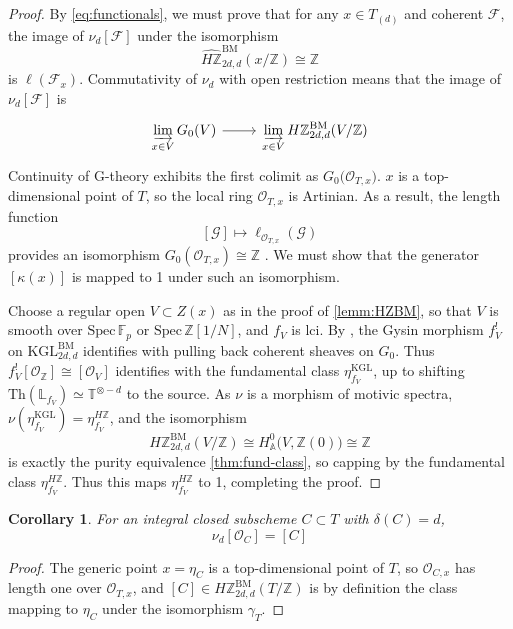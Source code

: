 \documentclass[11pt, twoside]{article}
\numberwithin{equation}{section}
\newtheorem{corollary}[equation]{Corollary}
\theoremstyle{definition}
\newcommand{\bb}[1]{\mathbb{#1}}
\newcommand{\colim}{\varinjlim}
\newcommand{\spec}{\mathrm{Spec} \,}
\newcommand{\Kgl}{\mathrm{KGL}}
\newcommand{\bm}{\mathrm{BM}}
\begin{document}
\begin{proof}
By \ref{eq:functionals}, we must prove that for any \(x \in T_{(d)}\) and coherent \(\mathcal{F}\), the image of \(\nu_d[\mathcal{F}]\) under the isomorphism
\[\hat{H\bb{Z}}_{2d, d}^\bm(x/\bb{Z}) \cong \bb{Z}\]
is \(\ell(\mathcal{F}_x)\). Commutativity of \(\nu_d\) with open restriction means that the image of \(\nu_d[\mathcal{F}]\) is 
\[\begin{tikzcd}
\displaystyle \colim_{x \in V} G_0(V)\ar[r] & \displaystyle \colim_{x \in V} H\bb{Z}_{2d, d}^\bm(V/\bb{Z})
\end{tikzcd}\]
Continuity of G-theory \cite[Proposition 2.2]{Qu} exhibits the first colimit as \(G_0\big(\mathscr{O}_{T, x}\big)\). \(x\) is a top-dimensional point of \(T\), so the local ring \(\mathscr{O}_{T, x}\) is Artinian. As a result, the length function 
\[[\mathscr{G}] \mapsto \ell_{\mathscr{O}_{T, x}}(\mathscr{G})\]
provides an isomorphism \(G_0(\mathscr{O}_{T, x}) \cong \bb{Z}\) \cite[Tag 00JI]{Sta}. We must show that the generator \([\kappa(x)]\) is mapped to 1 under such an isomorphism.

Choose a regular open \(V \subset Z(x)\) as in the proof of \ref{lemm:HZBM}, so that \(V\) is smooth over \(\spec \bb{F}_p\) or \(\spec \bb{Z}[1/N]\), and \(f_V\) is lci. By \cite[Corollary 3.3.7]{Jin}, the Gysin morphism \(f_V^!\) on \(\Kgl_{2d, d}^\bm\) identifies with pulling back coherent sheaves on \(G_0\). Thus \(f_V^![\mathscr{O}_\bb{Z}] \cong [\mathscr{O}_V]\) identifies with the fundamental class \(\eta_{f_V}^\Kgl\), up to shifting \(\mathrm{Th}(\bb{L}_{f_V}) \simeq \bb{T}^{\otimes - d}\) to the source. As \(\nu\) is a morphism of motivic spectra, \(\nu(\eta_{f_V}^\Kgl) = \eta_{f_V}^{H\bb{Z}}\), and the isomorphism 
\[H\bb{Z}_{2d, d}^\bm(V/\bb{Z}) \cong H_\bb{A}^0\big(V, \bb{Z}(0)\big) \cong \bb{Z}\]
is exactly the purity equivalence \ref{thm:fund-class}, so capping by the fundamental class \(\eta_{f_V}^{H\bb{Z}}\). Thus this maps \(\eta_{f_V}^{H\bb{Z}}\) to 1, completing the proof. 
\end{proof}

\begin{corollary}
For an integral closed subscheme \(C \subset T\) with \(\delta(C) = d\), 
\begin{equation}\label{eq:nu-int}
\nu_d[\mathscr{O}_C] = [C]
\end{equation}
\end{corollary}

\begin{proof}
The generic point \(x = \eta_C\) is a top-dimensional point of \(T\), so \(\mathscr{O}_{C, x}\) has length one over \(\mathscr{O}_{T, x}\), and \([C] \in H\bb{Z}_{2d, d}^\bm(T/\bb{Z})\) is by definition the class mapping to \(\eta_C\) under the isomorphism \(\gamma_T\).
\end{proof}
\end{document}
